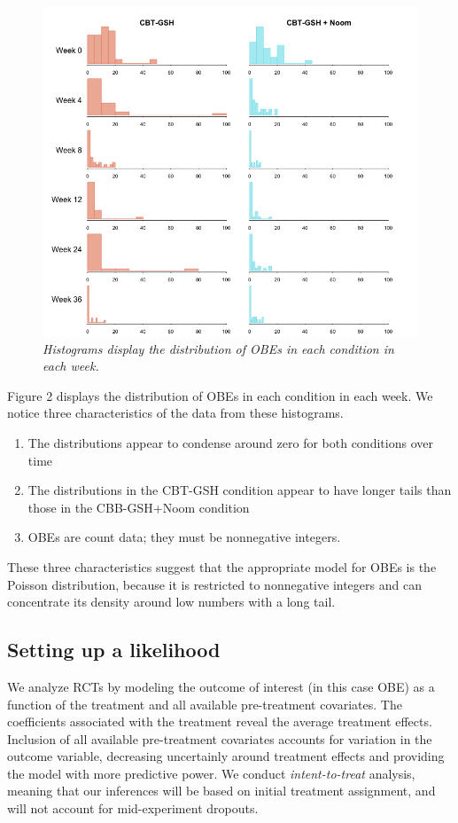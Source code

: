 \documentclass[12pt, oneside]{article}
\begin{document}
\begin{figure}[h]
\centering
\includegraphics[width=\textwidth, height=\textheight, keepaspectratio]{noom_hist.png}
\caption{\emph{Histograms display the distribution of OBEs in each condition in each week.}}
\end{figure}

Figure 2 displays the distribution of OBEs in each condition in each week.  We notice three characteristics of the data from these histograms.
\begin{enumerate}
\item{The distributions appear to condense around zero for both conditions over time} 
\item{The distributions in the CBT-GSH condition appear to have longer tails than those in the CBB-GSH+Noom condition}
\item{OBEs are count data; they must be nonnegative integers.}
\end{enumerate}
These three characteristics suggest that the appropriate model for OBEs is the Poisson distribution, because it is restricted to nonnegative integers and can concentrate its density around low numbers with a long tail.

\subsection*{Setting up a likelihood}
We analyze RCTs by modeling the outcome of interest (in this case OBE) as a function of the treatment and all available pre-treatment covariates.  The coefficients associated with the treatment reveal the average treatment effects.  Inclusion of all available pre-treatment covariates accounts for variation in the outcome variable, decreasing uncertainly around treatment effects and providing the model with more predictive power.  We conduct \emph{intent-to-treat} analysis, meaning that our inferences will be based on initial treatment assignment, and will not account for mid-experiment dropouts.  
\\
\end{document}
